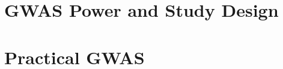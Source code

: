 \documentclass{pset}
\begin{document}
\section{GWAS Power and Study Design}

\subsection{}

\subsection{}

\subsection{\bLozenge\bLozenge\bLozenge}

\section{Practical GWAS}

\subsection{}

\subsection{}

\subsection{}
\end{document}
